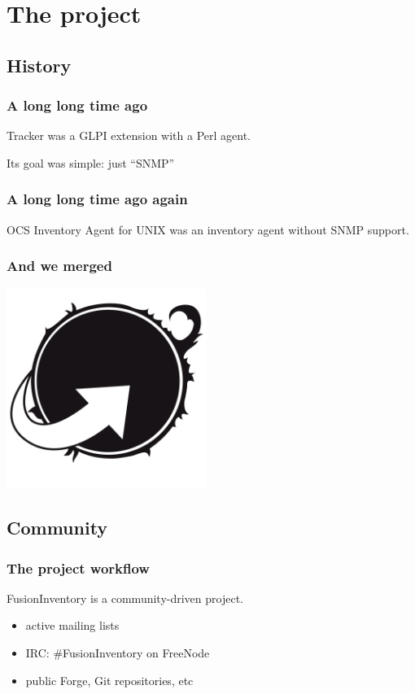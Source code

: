 \documentclass{beamer}
\begin{document}
\section{The project}

\subsection{History}
\begin{frame}
    \frametitle{A long long time ago}

    Tracker was a GLPI extension with a Perl agent.

    Its goal was simple: just “SNMP”
\end{frame}

\begin{frame}
    \frametitle{A long long time ago again}
    
    OCS Inventory Agent for UNIX was an inventory agent without SNMP support.

\end{frame}

\begin{frame}
    \frametitle{And we merged}
    
    \begin{center}
    \includegraphics[height=6.5cm]{./pics/fusinv.pdf}
    \end{center}
\end{frame}


\subsection{Community}

\begin{frame}
    \frametitle{The project workflow}
    FusionInventory is a community-driven project.

    \begin{itemize}
        \item active mailing lists
        \item IRC: \#FusionInventory on FreeNode
        \item public Forge, Git repositories, etc
    \end{itemize}
\end{frame}
\end{document}
